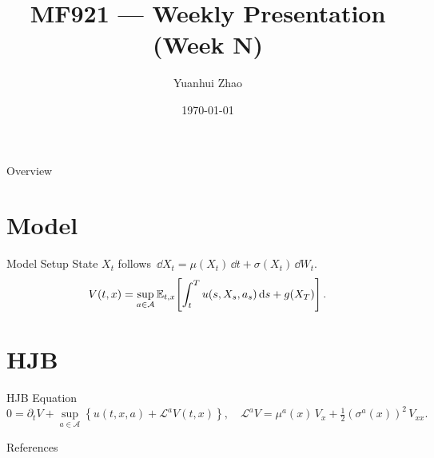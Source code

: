 \documentclass[aspectratio=169]{beamer}
\title[Week N]{MF921 — Weekly Presentation (Week N)}
\author{Yuanhui Zhao}
\institute{Boston University}
\date{\today}
\begin{document}
\begin{frame}
  \titlepage
\end{frame}

\begin{frame}{Overview}
\tableofcontents
\end{frame}

\section{Model}
\begin{frame}{Model Setup}
State $X_t$ follows $\,\dd X_t = \mu(X_t)\,\dd t + \sigma(X_t)\,\dd W_t$.
\[
V(t,x) = \sup_{a\in\mathcal{A}} \mathbb{E}_{t,x}\!\left[\int_t^T u(s,X_s,a_s)\,\dd s + g(X_T)\right].
\]
\end{frame}

\section{HJB}
\begin{frame}{HJB Equation}
\[
0 = \partial_t V + \sup_{a\in\mathcal{A}}
\left\{ u(t,x,a) + \mathcal{L}^a V(t,x) \right\},
\quad
\mathcal{L}^a V = \mu^a(x)\,V_x + \tfrac12 (\sigma^a(x))^2 \,V_{xx}.
\]
\end{frame}

\begin{frame}[allowframebreaks]{References}
\printbibliography
\end{frame}
\end{document}
